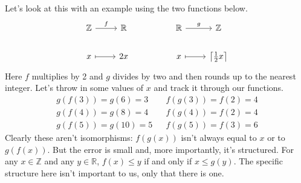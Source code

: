 \documentclass[12pt]{article}
\newcounter{examp}
\begin{document}
Let's look at this with an example using the two functions below.
\[\begin{tikzcd}
    {\mathbb{Z}} & {\mathbb{R}} && {\mathbb{R}} & {\mathbb{Z}} \\
    x & 2x && x & {\big\lceil \frac{1}{2}x \big\rceil}
    \arrow["f", from=1-1, to=1-2]
    \arrow[maps to, from=2-1, to=2-2]
    \arrow["g", from=1-4, to=1-5]
    \arrow[maps to, from=2-4, to=2-5]
  \end{tikzcd}\]
Here $f$ multiplies by 2 and $g$ divides by two and then rounds up to the nearest integer.
Let's throw in some values of $x$ and track it through our functions.
\begin{align*}
  g(f(3))=g(6)=3  &  & f(g(3))=f(2)=4 \\
  g(f(4))=g(8)=4  &  & f(g(4))=f(2)=4 \\
  g(f(5))=g(10)=5 &  & f(g(5))=f(3)=6
\end{align*}
Clearly these aren't isomorphisms: $f(g(x))$ isn't always equal to $x$ or to $g(f(x))$.
But the error is small and, more importantly, it's structured.
For any $x\in\mathbb{Z}$ and any $y\in\mathbb{R}$, $f(x) \le y$ if and only if $x \le g(y)$.
The specific structure here isn't important to us, only that there is one.
\end{document}
